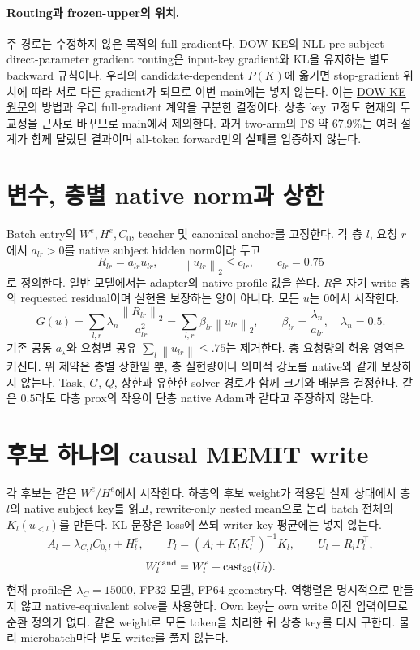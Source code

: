 \documentclass[11pt]{article}
\newcommand{\norm}[1]{\left\lVert #1\right\rVert}
\begin{document}
\paragraph{Routing과 frozen-upper의 위치.}
주 경로는 수정하지 않은 목적의 full gradient다.
DOW-KE의 NLL pre-subject direct-parameter gradient routing은
input-key gradient와 KL을 유지하는 별도 backward 규칙이다.
우리의 candidate-dependent $P(K)$에 옮기면 stop-gradient 위치에 따라
서로 다른 gradient가 되므로 이번 main에는 넣지 않는다.
이는 \href{https://arxiv.org/html/2608.16932v1}{DOW-KE 원문}의
방법과 우리 full-gradient 계약을 구분한 결정이다.
상층 key 고정도 현재의 두 교정을 근사로 바꾸므로 main에서 제외한다.
과거 two-arm의 PS 약 67.9\%는 여러 설계가 함께 달랐던 결과이며
all-token forward만의 실패를 입증하지 않는다.

\section{변수, 층별 native norm과 상한}
Batch entry의 $W^e,H^e,C_0$, teacher 및 canonical anchor를 고정한다.
각 층 $l$, 요청 $r$에서 $a_{lr}>0$를 native subject hidden norm이라 두고
\[
 R_{lr}=a_{lr}u_{lr},\qquad
 \norm{u_{lr}}_2\le c_{lr},\qquad c_{lr}=0.75
\]
로 정의한다. 일반 모델에서는 adapter의 native profile 값을 쓴다.
$R$은 자기 write 층의 requested residual이며 실현을 보장하는 양이 아니다.
모든 $u$는 0에서 시작한다.
\[
 G(u)=\sum_{l,r}\lambda_n\frac{\norm{R_{lr}}_2}{a_{lr}^2}
     =\sum_{l,r}\beta_{lr}\norm{u_{lr}}_2,\qquad
 \beta_{lr}=\frac{\lambda_n}{a_{lr}},\quad \lambda_n=0.5 .
\]
기존 공통 $a_\star$와 요청별 공유 $\sum_l\norm{u_{lr}}\le.75$는 제거한다.
총 요청량의 허용 영역은 커진다. 위 제약은 층별 상한일 뿐,
총 실현량이나 의미적 강도를 native와 같게 보장하지 않는다.
Task, $G$, $Q$, 상한과 유한한 solver 경로가 함께 크기와 배분을 결정한다.
같은 $0.5$라도 다층 prox의 작용이 단층 native Adam과 같다고 주장하지 않는다.

\section{후보 하나의 causal MEMIT write}
각 후보는 같은 $W^e/H^e$에서 시작한다.
하층의 후보 weight가 적용된 실제 상태에서 층 $l$의 native subject key를 읽고,
rewrite-only nested mean으로 논리 batch 전체의 $K_l(u_{<l})$를 만든다.
KL 문장은 loss에 쓰되 writer key 평균에는 넣지 않는다.
\[
 A_l=\lambda_{C,l}C_{0,l}+H_l^e,\qquad
 P_l=(A_l+K_lK_l^\top)^{-1}K_l,\qquad U_l=R_lP_l^\top ,
\]
\[
 W_l^{\rm cand}=W_l^e+\operatorname{cast}_{32}(U_l).
\]
현재 profile은 $\lambda_C=15000$, FP32 모델, FP64 geometry다.
역행렬은 명시적으로 만들지 않고 native-equivalent solve를 사용한다.
Own key는 own write 이전 입력이므로 순환 정의가 없다.
같은 weight로 모든 token을 처리한 뒤 상층 key를 다시 구한다.
물리 microbatch마다 별도 writer를 풀지 않는다.
\end{document}
